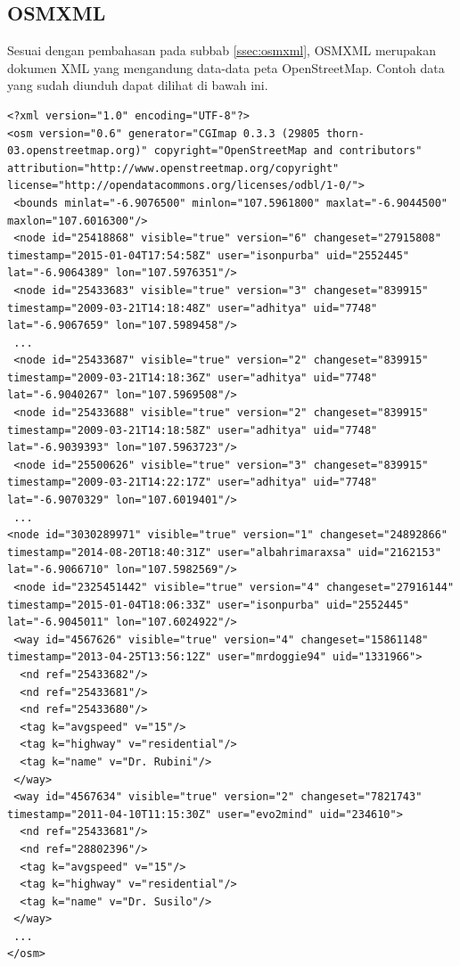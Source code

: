 \subsection{OSMXML}
Sesuai dengan pembahasan pada subbab \ref{ssec:osmxml}, OSMXML merupakan dokumen
XML yang mengandung data-data peta OpenStreetMap. Contoh data yang sudah diunduh
dapat dilihat di bawah ini.
\begin{lstlisting}
<?xml version="1.0" encoding="UTF-8"?>
<osm version="0.6" generator="CGImap 0.3.3 (29805 thorn-03.openstreetmap.org)" copyright="OpenStreetMap and contributors" attribution="http://www.openstreetmap.org/copyright" license="http://opendatacommons.org/licenses/odbl/1-0/">
 <bounds minlat="-6.9076500" minlon="107.5961800" maxlat="-6.9044500" maxlon="107.6016300"/>
 <node id="25418868" visible="true" version="6" changeset="27915808" timestamp="2015-01-04T17:54:58Z" user="isonpurba" uid="2552445" lat="-6.9064389" lon="107.5976351"/>
 <node id="25433683" visible="true" version="3" changeset="839915" timestamp="2009-03-21T14:18:48Z" user="adhitya" uid="7748" lat="-6.9067659" lon="107.5989458"/>
 ...
 <node id="25433687" visible="true" version="2" changeset="839915" timestamp="2009-03-21T14:18:36Z" user="adhitya" uid="7748" lat="-6.9040267" lon="107.5969508"/>
 <node id="25433688" visible="true" version="2" changeset="839915" timestamp="2009-03-21T14:18:58Z" user="adhitya" uid="7748" lat="-6.9039393" lon="107.5963723"/>
 <node id="25500626" visible="true" version="3" changeset="839915" timestamp="2009-03-21T14:22:17Z" user="adhitya" uid="7748" lat="-6.9070329" lon="107.6019401"/>
 ...
<node id="3030289971" visible="true" version="1" changeset="24892866" timestamp="2014-08-20T18:40:31Z" user="albahrimaraxsa" uid="2162153" lat="-6.9066710" lon="107.5982569"/>
 <node id="2325451442" visible="true" version="4" changeset="27916144" timestamp="2015-01-04T18:06:33Z" user="isonpurba" uid="2552445" lat="-6.9045011" lon="107.6024922"/>
 <way id="4567626" visible="true" version="4" changeset="15861148" timestamp="2013-04-25T13:56:12Z" user="mrdoggie94" uid="1331966">
  <nd ref="25433682"/>
  <nd ref="25433681"/>
  <nd ref="25433680"/>
  <tag k="avgspeed" v="15"/>
  <tag k="highway" v="residential"/>
  <tag k="name" v="Dr. Rubini"/>
 </way>
 <way id="4567634" visible="true" version="2" changeset="7821743" timestamp="2011-04-10T11:15:30Z" user="evo2mind" uid="234610">
  <nd ref="25433681"/>
  <nd ref="28802396"/>
  <tag k="avgspeed" v="15"/>
  <tag k="highway" v="residential"/>
  <tag k="name" v="Dr. Susilo"/>
 </way>
 ...
</osm>
\end{lstlisting}
